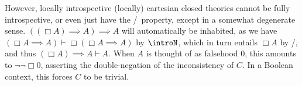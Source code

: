 \begin{observation}
However, locally introspective (locally) cartesian closed theories cannot be fully introspective, or even just have the \Loeb/\ property, except in a somewhat degenerate sense. $((\Box A) \implies A) \implies A$ will automatically be inhabited, as we have $(\Box A \implies A) \vdash \Box (\Box A \implies A)$ by $\introN$, which in turn entails $\Box A$ by \Loeb/, and thus $(\Box A) \implies A \vdash A$. When $A$ is thought of as falsehood $0$, this amounts to $\neg \neg \Box 0$, asserting the double-negation of the inconsistency of $C$. In a Boolean context, this forces $C$ to be trivial.

\end{observation}

\fileend